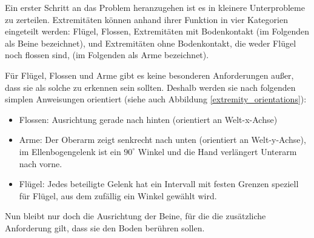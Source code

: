 Ein erster Schritt an das Problem heranzugehen ist es in kleinere Unterprobleme zu zerteilen.
Extremitäten können anhand ihrer Funktion in vier Kategorien eingeteilt werden:
Flügel, Flossen, Extremitäten mit Bodenkontakt (im Folgenden als Beine bezeichnet), und Extremitäten ohne Bodenkontakt, die weder Flügel noch flossen sind, (im Folgenden als Arme bezeichnet).

Für Flügel, Flossen und Arme gibt es keine besonderen Anforderungen außer, dass sie als solche zu erkennen sein sollten. Deshalb werden sie nach folgenden simplen Anweisungen orientiert (siehe auch Abbildung \ref{extremity_orientations}):
\begin{itemize}
 \item Flossen: Ausrichtung gerade nach hinten (orientiert an Welt-x-Achse)
 \item Arme: Der Oberarm zeigt senkrecht nach unten (orientiert an Welt-y-Achse), im Ellenbogengelenk ist ein $90^{\circ}$ Winkel und die Hand verlängert Unterarm nach vorne.
 \item Flügel: Jedes beteiligte Gelenk hat ein Intervall mit festen Grenzen speziell für Flügel, aus dem zufällig ein Winkel gewählt wird.
\end{itemize}

Nun bleibt nur doch die Ausrichtung der Beine, für die die zusätzliche Anforderung gilt, dass sie den Boden berühren sollen.

